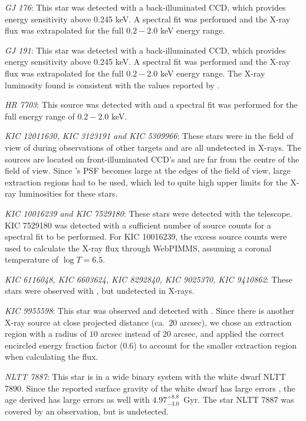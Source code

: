 \textit{GJ 176}: This star was detected with a back-illuminated \Chandra CCD, which provides energy sensitivity above 0.245 keV. A spectral fit was performed and the X-ray flux was extrapolated for the full $0.2 - 2.0$ keV energy range.

\textit{GJ 191}: This star was detected with a back-illuminated \Chandra CCD, which provides energy sensitivity above 0.245 keV. A spectral fit was performed and the X-ray flux was extrapolated for the full $0.2 - 2.0$ keV energy range. The X-ray luminosity found is consistent with the values reported by \citet{Guinan_etal_2016}.

\textit{HR 7703}: This source was detected with \XMM and a spectral fit was performed for the full energy range of $0.2 - 2.0$ keV.

\textit{KIC 12011630, KIC 3123191 and KIC 5309966}: These stars were in the field of view of \Chandra during observations of other targets and are all undetected in X-rays. The sources are located on front-illuminated CCD's and are far from the centre of the field of view. Since \Chandra's PSF becomes large at the edges of the field of view, large extraction regions had to be used, which led to quite high upper limits for the X-ray luminosities for these stars.

\textit{KIC 10016239 and KIC 7529180}: These stars were detected with the \XMM telescope. KIC 7529180 was detected with a sufficient number of source counts for a spectral fit to be performed. For KIC 10016239, the excess source counts were used to calculate the X-ray flux through WebPIMMS, assuming a coronal temperature of $\log T = 6.5$.

\textit{KIC 6116048, KIC 6603624, KIC 8292840, KIC 9025370, KIC 9410862}: These stars were observed with \XMM, but undetected in X-rays.

\textit{KIC 9955598}: This star was observed and detected with \XMM. Since there is another X-ray source at close projected distance (ca.\ $20$ arcsec), we chose an extraction region with a radius of $10$ arcsec instead of $20$ arcsec, and applied the correct encircled energy fraction factor (0.6) to account for the smaller extraction region when calculating the flux.

\textit{NLTT 7887}: This star is in a wide binary system with the white dwarf NLTT 7890. Since the reported surface gravity of the white dwarf has large errors \citep{Garces_etal_2011}, the age derived has large errors as well with $4.97^{+8.8}_{-3.0}$~Gyr. The star NLTT 7887 was covered by an \XMM observation, but is undetected.

